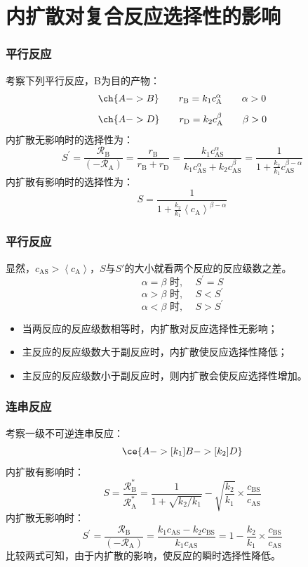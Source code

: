 \documentclass[dvipsnames, svgnames, x11names]{beamer}
\begin{document}
\section{内扩散对复合反应选择性的影响}


\begin{frame}
    \frametitle{平行反应}

    考察下列平行反应，B为目的产物：
    \[
        \ch{A -> B} \qquad r_\mathrm{B} = k_1c_\mathrm{A}^ \alpha \qquad \alpha>0
    \]
    \[
        \ch{A -> D} \qquad r_\mathrm{D} = k_2c_\mathrm{A}^ \beta \qquad \beta>0
    \]
    内扩散无影响时的选择性为：
    \[
        S^{\prime}=\frac{\mathscr{R}_{\mathrm{B}}}{(-\mathscr{R}_{\mathrm{A}})}=\frac{r_{\mathrm{B}}}{r_{\mathrm{B}}+r_{\mathrm{D}}}=\frac{k_{1} c_{\mathrm{AS}}^{\alpha}}{k_{1} c_{\mathrm{AS}}^{\alpha}+k_{2} c_{\mathrm{AS}}^{\beta}}=\frac{1}{1+\frac{k_{2}}{k_{1}} c_{\mathrm{AS}}^{\beta-\alpha}} 
    \]
    内扩散有影响时的选择性为：
    \[
        S=\frac{1}{1+\frac{k_{2}}{k_{1}}\left\langle c_{\mathrm{A}}\right\rangle^{\beta-\alpha}}
    \]

\end{frame}


\begin{frame}
    \frametitle{平行反应}

    显然，$c_{\mathrm{AS}} > \left\langle c_{\mathrm{A}}\right\rangle$，$S$与$S'$的大小就看两个反应的反应级数之差。
    \[
        \alpha=\beta \text { 时, } \quad S^{\prime}=S
    \]
    \[
        \alpha>\beta \text { 时, } \quad S<S^{\prime}
    \]
    \[
        \alpha<\beta \text { 时, } \quad S>S^{\prime}
    \] 
    \begin{itemize}
        \item 当两反应的反应级数相等时，内扩散对反应选择性无影响；
        \item 主反应的反应级数大于副反应时，内扩散使反应选择性降低；
        \item 主反应的反应级数小于副反应时，则内扩散会使反应选择性增加。
    \end{itemize}

\end{frame}


\begin{frame}
    \frametitle{连串反应}
    考察一级不可逆连串反应：
    \[
        \ce{A ->[k_1] B ->[k_2] D}
    \]
    内扩散有影响时：
    \[
        S=\frac{\mathscr{R}_{\mathrm{B}}^{*}}{\mathscr{R}_{\mathrm{A}}^{*}}=\frac{1}{1+\sqrt{k_{2} / k_{1}}}-\sqrt{\frac{k_{2}}{k_{1}}} \times \frac{c_{\mathrm{BS}}}{c_{\mathrm{AS}}} 
    \]
    内扩散无影响时：
    \[
        S^{\prime}=\frac{\mathscr{R}_{\mathrm{B}}}{(-\mathscr{R}_{\mathrm{A}})}=\frac{k_{1} c_{\mathrm{AS}}-k_{2} c_{\mathrm{BS}}}{k_{1} c_{\mathrm{AS}}}=1-\frac{k_{2}}{k_{1}} \times \frac{c_{\mathrm{BS}}}{c_{\mathrm{AS}}}
    \]
    比较两式可知，由于内扩散的影响，使反应的瞬时选择性降低。

\end{frame}
\end{document}
